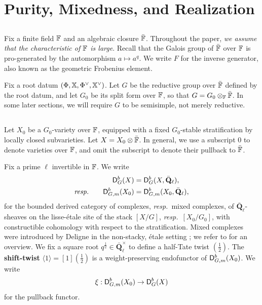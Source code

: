 \documentclass[a4paper,10pt,leqno]{amsart}
\theoremstyle{plain}
\theoremstyle{plain}
\theoremstyle{plain}
\theoremstyle{definition}
\theoremstyle{remark}
\newcommand{\dfemph}[1]{\textbf{#1}}
\newcommand{\QL}{\bar{\mathbf{Q}}_\ell}
\begin{document}
\newpage
\section{Purity, Mixedness, and Realization}\label{sec:mixed}

\subsection{}

Fix a finite field $\bb{F}$ and an algebraic closure $\bar{\bb{F}}$.
Throughout the paper, \emph{we assume that the characteristic of $\bb{F}$ is large}.
Recall that the Galois group of $\bar{\bb{F}}$ over $\bb{F}$ is pro-generated by the automorphism $a \mapsto a^q$.
We write $F$ for the inverse generator, also known as the geometric Frobenius element.

Fix a root datum $(\Phi, \bb{X}, \Phi^\vee, \bb{X}^\vee)$.
Let $G$ be the reductive group over $\bar{\bb{F}}$ defined by the root datum, and let $G_0$ be its split form over $\bb{F}$, so that $G = G_0 \otimes_\bb{F} \bar{\bb{F}}$.
In some later sections, we will require $G$ to be semisimple, not merely reductive.

\subsection{}

Let $X_0$ be a $G_0$-variety over $\bb{F}$, equipped with a fixed $G_0$-stable stratification by locally closed subvarieties.
Let $X = X_0 \otimes \bar{\bb{F}}$.
In general, we use a subscript $0$ to denote varieties over $\bb{F}$, and omit the subscript to denote their pullback to $\bar{\bb{F}}$.

Fix a prime $\ell$ invertible in $\bb{F}$.
We write 
\begin{align}
\sf{D}_G^b(X) &= \sf{D}_G^b(X, \QL),\\
\emph{resp.}\qquad
\sf{D}_{G, m}^b(X_0) &= \sf{D}_{G, m}^b(X_0, \QL),
\end{align}
for the bounded derived category of complexes, \emph{resp.}\ mixed complexes, of $\QL$-sheaves on the lisse-\'etale site of the stack $[X/G]$, \emph{resp.}\ $[X_0/G_0]$, with constructible cohomology with respect to the stratification.
Mixed complexes were introduced by Deligne in the non-stacky, \'etale setting \cite{deligne_1980}; we refer to \cite[Ch.\ 5]{bbd} for an overview.
We fix a square root $q^{\frac{1}{2}} \in \QL^\times$ to define a half-Tate twist $(\frac{1}{2})$.
The \dfemph{shift-twist} $\langle 1 \rangle = [1](\frac{1}{2})$ is a weight-preserving endofunctor of $\sf{D}_{G, m}^b(X_0)$.
We write 
\begin{align}
\xi : \sf{D}_{G, m}^b(X_0) \to \sf{D}_G^b(X)
\end{align}
for the pullback functor.
\end{document}
